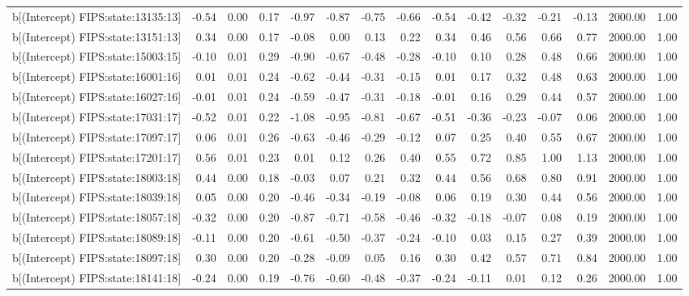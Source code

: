 \begin{table}[ht]
\begin{tabular}{rrrrrrrrrrrrrrr}
  b[(Intercept) FIPS:state:13135:13] & -0.54 & 0.00 & 0.17 & -0.97 & -0.87 & -0.75 & -0.66 & -0.54 & -0.42 & -0.32 & -0.21 & -0.13 & 2000.00 & 1.00 \\ 
  b[(Intercept) FIPS:state:13151:13] & 0.34 & 0.00 & 0.17 & -0.08 & 0.00 & 0.13 & 0.22 & 0.34 & 0.46 & 0.56 & 0.66 & 0.77 & 2000.00 & 1.00 \\ 
  b[(Intercept) FIPS:state:15003:15] & -0.10 & 0.01 & 0.29 & -0.90 & -0.67 & -0.48 & -0.28 & -0.10 & 0.10 & 0.28 & 0.48 & 0.66 & 2000.00 & 1.00 \\ 
  b[(Intercept) FIPS:state:16001:16] & 0.01 & 0.01 & 0.24 & -0.62 & -0.44 & -0.31 & -0.15 & 0.01 & 0.17 & 0.32 & 0.48 & 0.63 & 2000.00 & 1.00 \\ 
  b[(Intercept) FIPS:state:16027:16] & -0.01 & 0.01 & 0.24 & -0.59 & -0.47 & -0.31 & -0.18 & -0.01 & 0.16 & 0.29 & 0.44 & 0.57 & 2000.00 & 1.00 \\ 
  b[(Intercept) FIPS:state:17031:17] & -0.52 & 0.01 & 0.22 & -1.08 & -0.95 & -0.81 & -0.67 & -0.51 & -0.36 & -0.23 & -0.07 & 0.06 & 2000.00 & 1.00 \\ 
  b[(Intercept) FIPS:state:17097:17] & 0.06 & 0.01 & 0.26 & -0.63 & -0.46 & -0.29 & -0.12 & 0.07 & 0.25 & 0.40 & 0.55 & 0.67 & 2000.00 & 1.00 \\ 
  b[(Intercept) FIPS:state:17201:17] & 0.56 & 0.01 & 0.23 & 0.01 & 0.12 & 0.26 & 0.40 & 0.55 & 0.72 & 0.85 & 1.00 & 1.13 & 2000.00 & 1.00 \\ 
  b[(Intercept) FIPS:state:18003:18] & 0.44 & 0.00 & 0.18 & -0.03 & 0.07 & 0.21 & 0.32 & 0.44 & 0.56 & 0.68 & 0.80 & 0.91 & 2000.00 & 1.00 \\ 
  b[(Intercept) FIPS:state:18039:18] & 0.05 & 0.00 & 0.20 & -0.46 & -0.34 & -0.19 & -0.08 & 0.06 & 0.19 & 0.30 & 0.44 & 0.56 & 2000.00 & 1.00 \\ 
  b[(Intercept) FIPS:state:18057:18] & -0.32 & 0.00 & 0.20 & -0.87 & -0.71 & -0.58 & -0.46 & -0.32 & -0.18 & -0.07 & 0.08 & 0.19 & 2000.00 & 1.00 \\ 
  b[(Intercept) FIPS:state:18089:18] & -0.11 & 0.00 & 0.20 & -0.61 & -0.50 & -0.37 & -0.24 & -0.10 & 0.03 & 0.15 & 0.27 & 0.39 & 2000.00 & 1.00 \\ 
  b[(Intercept) FIPS:state:18097:18] & 0.30 & 0.00 & 0.20 & -0.28 & -0.09 & 0.05 & 0.16 & 0.30 & 0.42 & 0.57 & 0.71 & 0.84 & 2000.00 & 1.00 \\ 
  b[(Intercept) FIPS:state:18141:18] & -0.24 & 0.00 & 0.19 & -0.76 & -0.60 & -0.48 & -0.37 & -0.24 & -0.11 & 0.01 & 0.12 & 0.26 & 2000.00 & 1.00 \\ 

\end{tabular}
\end{table}
